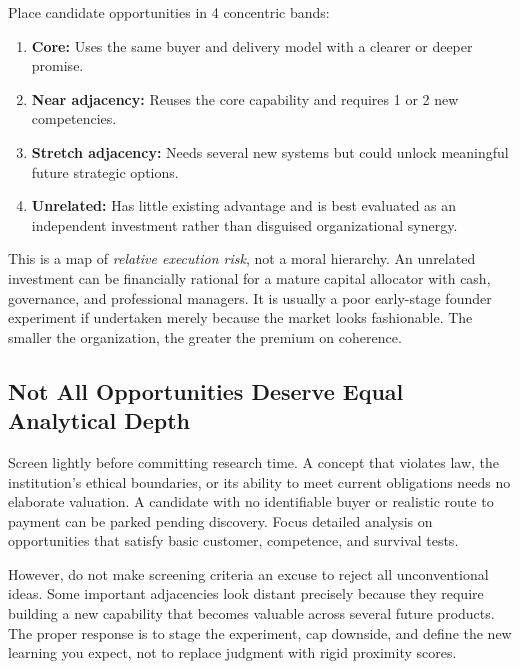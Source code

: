 Place candidate opportunities in 4 concentric bands:
\begin{enumerate}
    \item \textbf{Core:} Uses the same buyer and delivery model with a clearer or deeper promise.
    \item \textbf{Near adjacency:} Reuses the core capability and requires 1 or 2 new competencies.
    \item \textbf{Stretch adjacency:} Needs several new systems but could unlock meaningful future strategic options.
    \item \textbf{Unrelated:} Has little existing advantage and is best evaluated as an independent investment rather than disguised organizational synergy.
\end{enumerate}

This is a map of \textit{relative execution risk}, not a moral hierarchy. An unrelated investment can be financially rational for a mature capital allocator with cash, governance, and professional managers. It is usually a poor early-stage founder experiment if undertaken merely because the market looks fashionable. The smaller the organization, the greater the premium on coherence.

\subsection{Not All Opportunities Deserve Equal Analytical Depth}
\label{sec:not_all_opportunities_equal_depth}

Screen lightly before committing research time. A concept that violates law, the institution's ethical boundaries, or its ability to meet current obligations needs no elaborate valuation. A candidate with no identifiable buyer or realistic route to payment can be parked pending discovery. Focus detailed analysis on opportunities that satisfy basic customer, competence, and survival tests.

However, do not make screening criteria an excuse to reject all unconventional ideas. Some important adjacencies look distant precisely because they require building a new capability that becomes valuable across several future products. The proper response is to stage the experiment, cap downside, and define the new learning you expect, not to replace judgment with rigid proximity scores.
